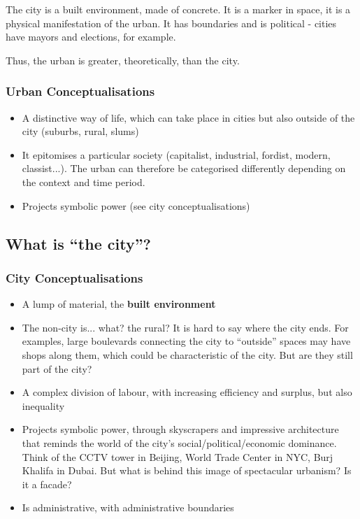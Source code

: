 \documentclass{article}
\begin{document}
The city is a built environment, made of concrete. It is a marker in space, it is a physical manifestation of the urban. 
It has boundaries and is political - cities have mayors and elections, for example.

Thus, the urban is greater, theoretically, than the city.

\subsubsection{Urban Conceptualisations}

\begin{itemize}
  \item A distinctive way of life, which can take place in cities but also outside of the city (suburbs, rural, slums)
  \item It epitomises a particular society (capitalist, industrial, fordist, modern, classist...). The urban can therefore be categorised differently depending on the context and time period. 
  \item Projects symbolic power (see city conceptualisations)
\end{itemize}

\subsection{What is ``the city''?}

\subsubsection{City Conceptualisations}

\begin{itemize}
  \item A lump of material, the \textbf{built environment}
  \item The non-city is... what? the rural? It is hard to say where the city ends. For examples, large boulevards connecting the city to ``outside'' spaces may have shops along them, which could be characteristic of the city. But are they still part of the city?
  \item A complex division of labour, with increasing efficiency and surplus, but also inequality
  \item Projects symbolic power, through skyscrapers and impressive architecture that reminds the world of the city's social/political/economic dominance. Think of the CCTV tower in Beijing, World Trade Center in NYC, Burj Khalifa in Dubai. But what is behind this image of spectacular urbanism? Is it a facade?
  \item Is administrative, with administrative boundaries
\end{itemize}
\end{document}
